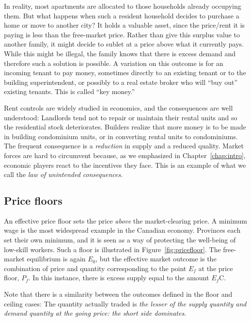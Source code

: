 

In reality, most apartments are allocated to those households already occupying them. But what happens when such a resident household decides to purchase a home or move to another city? It holds a valuable asset, since the price/rent it is paying is less than the free-market price. Rather than give this surplus value to another family, it might decide to sublet at a price above what it currently pays. While this might be illegal, the family knows that there is excess demand and therefore such a solution is possible. A variation on this outcome is for an incoming tenant to pay money, sometimes directly to an existing tenant or to the building superintendent, or possibly to a real estate broker who will ``buy out'' existing tenants. This is called ``key money.'' 

Rent controls are widely studied in economics, and the consequences are well understood: Landlords tend not to repair or maintain their rental units and so the residential stock deteriorates. Builders realize that more money is to be made in building condominium units, or in converting rental units to condominiums. The frequent consequence is a \textit{reduction} in supply and a reduced quality. Market forces are hard to circumvent because, as we emphasized in Chapter~\ref{chap:intro}, economic players react to the incentives they face. This is an example of what we call the \textit{law of unintended consequences}.

\subsection*{Price floors}

An effective price floor sets the price \textit{above} the market-clearing price. A minimum wage is the most widespread example in the Canadian economy. Provinces each set their own minimum, and it is seen as a way of protecting the well-being of low-skill workers. Such a floor is illustrated in Figure~\ref{fig:pricefloor}. The free-market equilibrium is again $E_0$, but the effective market outcome is the combination of price and quantity corresponding to the point $E_f$ at the price floor, $P_f$. In this instance, there is excess supply equal to the amount $E_f$C.



Note that there is a similarity between the outcomes defined in the floor and ceiling cases: The quantity actually traded is \textit{the lesser of the supply quantity and demand quantity at the going price: the short side dominates.}

